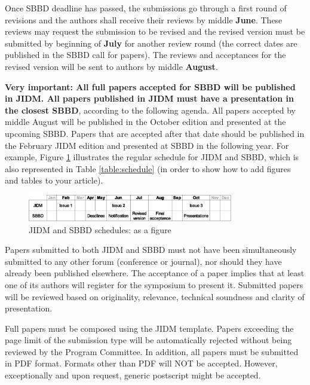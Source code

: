 \documentclass[jidm,a4paper]{jidm} %
\begin{document}
Once SBBD deadline has passed, the submissions go through a first round of revisions and the authors shall receive their reviews by middle \textbf{June}. These reviews may request the submission to be revised and the revised version must be submitted by beginning of \textbf{July} for another review round (the correct dates are published in the SBBD call for papers). The reviews and acceptances for the revised version will be sent to authors by middle \textbf{August}.

\textbf{Very important: All full papers accepted for SBBD will be published in JIDM. All papers published in JIDM must have a presentation in the closest SBBD}, according to the following agenda. All papers accepted by middle August will be published in the October edition and presented at the upcoming SBBD. Papers that are accepted after that date should be published in the February JIDM edition and presented at SBBD in the following year. For example, Figure \ref{fig:schedule} illustrates the regular schedule for JIDM and SBBD, which is also represented in Table \ref{table:schedule} (in order to show how to add figures and tables to your article).

\begin{figure}[t] %
	\centering	%
		\includegraphics[width=0.8\textwidth]{schedule.eps} %
	\caption{JIDM and SBBD schedules: as a figure}	%
	\label{fig:schedule} %
\end{figure}

Papers submitted to both JIDM and SBBD must not have been simultaneously submitted to any other forum (conference or journal), nor should they have already been published elsewhere.  The acceptance of a paper implies that at least one of its authors will register for the symposium to present it. Submitted papers will be reviewed based on originality, relevance, technical soundness and clarity of presentation.

Full papers must be composed using the JIDM template. Papers exceeding the page limit of the submission type will be automatically rejected without being reviewed by the Program Committee. In addition, all papers must be submitted in PDF format. Formats other than PDF will NOT be accepted. However, exceptionally and upon request, generic postscript might be accepted.
\end{document}
